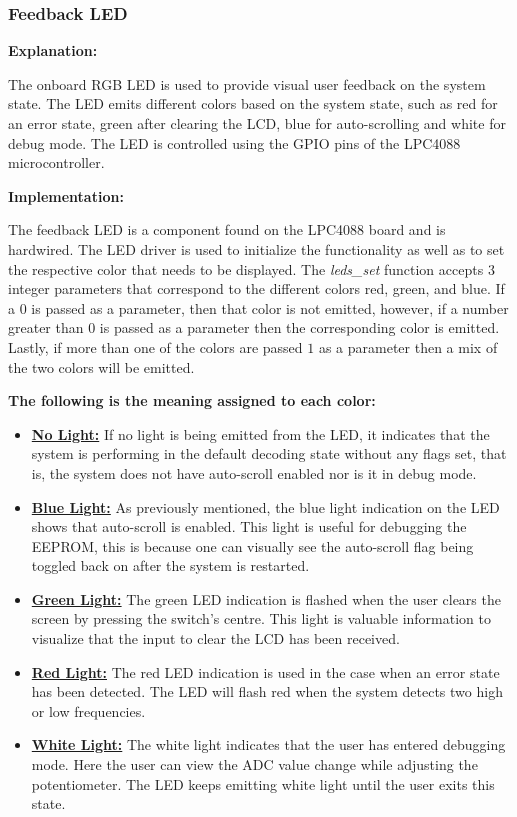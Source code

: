 \documentclass{cce2014-design}
\begin{document}
\subsubsection{Feedback LED}
\textbf{Explanation:}

The onboard RGB LED is used to provide visual user feedback on the system state. The LED emits different colors based on the system state, such as red for an error state, green after clearing the LCD, blue for auto-scrolling and white for debug mode. The LED is controlled using the GPIO pins of the LPC4088 microcontroller.

\vspace{1em}
\textbf{Implementation:}

The feedback LED is a component found on the LPC4088 board and is hardwired. The LED driver is used to initialize the functionality as well as to set the respective color that needs to be displayed. The \textit{leds\_set} function accepts $3$ integer parameters that correspond to the different colors red, green, and blue. If a $0$ is passed as a parameter, then that color is not emitted, however, if a number greater than $0$ is passed as a parameter then the corresponding color is emitted. Lastly, if more than one of the colors are passed $1$ as a parameter then a mix of the two colors will be emitted.

\vspace{1em}
\textbf{The following is the meaning assigned to each color:}

\begin{itemize}
   \item[{}] \textbf{\underline{No Light:}} If no light is being emitted from the LED, it indicates that the system is performing in the default decoding state without any flags set, that is, the system does not have auto-scroll enabled nor is it in debug mode.

   \item[{}] \textbf{\underline{Blue Light:}} As previously mentioned, the blue light indication on the LED shows that auto-scroll is enabled. This light is useful for debugging the EEPROM, this is because one can visually see the auto-scroll flag being toggled back on after the system is restarted.

   \item[{}] \textbf{\underline{Green Light:}} The green LED indication is flashed when the user clears the screen by pressing the switch's centre. This light is valuable information to visualize that the input to clear the LCD has been received.

   \item[{}] \textbf{\underline{Red Light:}} The red LED indication is used in the case when an error state has been detected. The LED will flash red when the system detects two high or low frequencies.

   \item[{}] \textbf{\underline{White Light:}} The white light indicates that the user has entered debugging mode. Here the user can view the ADC value change while adjusting the potentiometer. The LED keeps emitting white light until the user exits this state.
\end{itemize}
\end{document}
